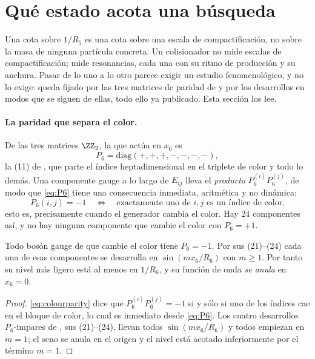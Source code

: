 \section{Qué estado acota una búsqueda}\label{sec:collider}

Una cota sobre $1/R_5$ es una cota sobre una escala de compactificación, no sobre la masa de
ninguna partícula concreta. Un colisionador no mide escalas de compactificación; mide resonancias,
cada una con su ritmo de producción y su anchura. Pasar de lo uno a lo otro parece exigir un
estudio fenomenológico, y no lo exige: queda fijado por las tres matrices de paridad de \cite{KM25}
y por los desarrollos en modos que se siguen de ellas, todo ello ya publicado. Esta sección los
lee.

\paragraph{La paridad que separa el color.} De las tres matrices $\ZZ_2$, la que actúa en $x_6$ es
\begin{equation}\label{eq:P6}
  P_6=\mathrm{diag}(+,+,+,-,-,-,-),
\end{equation}
la (11) de \cite{KM25}, que parte el índice heptadimensional en el triplete de color y todo lo
demás. Una componente gauge a lo largo de $E_{ij}$ lleva el \emph{producto} $P_6^{(i)}P_6^{(j)}$,
de modo que \eqref{eq:P6} tiene una consecuencia inmediata, aritmética y no dinámica:
\begin{equation}\label{eq:colourparity}
  P_6(i,j)=-1
  \quad\Longleftrightarrow\quad
  \text{exactamente uno de } i,j \text{ es un índice de color,}
\end{equation}
esto es, precisamente cuando el generador cambia el color. Hay $24$ componentes así, y no hay
ninguna componente que cambie el color con $P_6=+1$.

\begin{theorem}\label{thm:colourparity}
Todo bosón gauge de \cite{KM25} que cambie el color tiene $P_6=-1$. Por sus (21)--(24) cada una de
esas componentes se desarrolla en $\sin(m x_6/R_6)$ con $m\ge1$. Por tanto su nivel más ligero está
al menos en $1/R_6$, y su función de onda \emph{se anula} en $x_6=0$.
\end{theorem}
\begin{proof}
\eqref{eq:colourparity} dice que $P_6^{(i)}P_6^{(j)}=-1$ si y sólo si uno de los índices cae en el
bloque de color, lo cual es inmediato desde \eqref{eq:P6}. Los cuatro desarrollos $P_6$-impares de
\cite{KM25}, sus (21)--(24), llevan todos $\sin(m x_6/R_6)$ y todos empiezan en $m=1$; el seno se
anula en el origen y el nivel está acotado inferiormente por el término $m=1$.
\end{proof}

